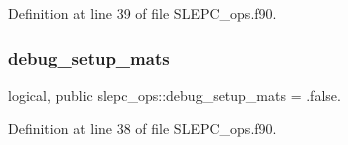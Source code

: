 Definition at line 39 of file S\+L\+E\+P\+C\+\_\+ops.\+f90.

\mbox{\label{namespaceslepc__ops_aff5aa0d485bc34e2f6e320172fcc4ccb}} 
\subsubsection{\texorpdfstring{debug\+\_\+setup\+\_\+mats}{debug\_setup\_mats}}
{\footnotesize\ttfamily logical, public slepc\+\_\+ops\+::debug\+\_\+setup\+\_\+mats = .false.}



Definition at line 38 of file S\+L\+E\+P\+C\+\_\+ops.\+f90.


